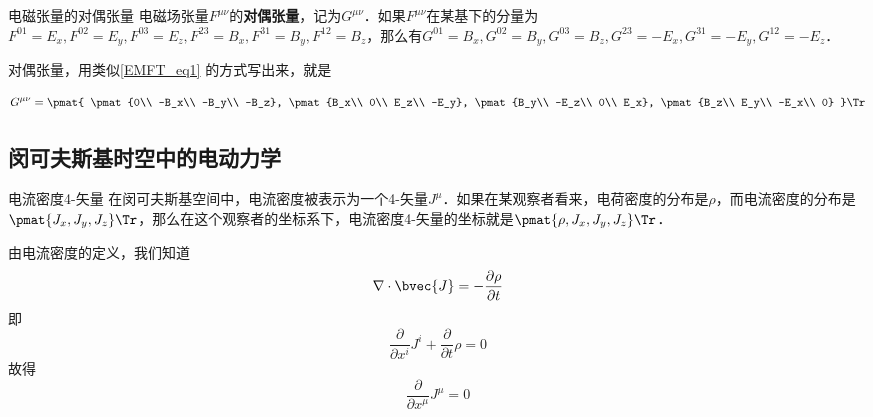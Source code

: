 \begin{definition}{电磁张量的对偶张量}
电磁场张量$F^{\mu\nu}$的\textbf{对偶张量}，记为$G^{\mu\nu}$．如果$F^{\mu\nu}$在某基下的分量为$F^{01}=E_x, F^{02}=E_y, F^{03}=E_z, F^{23}=B_x, F^{31}=B_y, F^{12}=B_z$，那么有$G^{01}=B_x, G^{02}=B_y, G^{03}=B_z, G^{23}=-E_x, G^{31}=-E_y, G^{12}=-E_z$．
\end{definition}

对偶张量，用类似\autoref{EMFT_eq1} 的方式写出来，就是

\begin{equation}
\begin{aligned}
G^{\mu\nu}=
\pmat{
\pmat{0\\ -B_x\\ -B_y\\ -B_z}, 
\pmat{B_x\\ 0\\ E_z\\ -E_y}, 
\pmat{B_y\\ -E_z\\ 0\\ E_x}, 
\pmat{B_z\\ E_y\\ -E_x\\ 0}
}\Tr
\end{aligned}
\end{equation}

\subsection{闵可夫斯基时空中的电动力学}

\begin{definition}{电流密度4-矢量}
在闵可夫斯基空间中，电流密度被表示为一个4-矢量$J^\mu$．如果在某观察者看来，电荷密度的分布是$\rho$，而电流密度的分布是$\pmat{J_x, J_y, J_z}\Tr$，那么在这个观察者的坐标系下，电流密度4-矢量的坐标就是$\pmat{\rho, J_x, J_y, J_z}\Tr$．
\end{definition}

由电流密度的定义，我们知道
\begin{equation}
\nabla\cdot\bvec{J}=-\frac{\partial\rho}{\partial t}
\end{equation}
即
\begin{equation}
\frac{\partial}{\partial x^i}J^i+\frac{\partial}{\partial t}\rho=0
\end{equation}
故得
\begin{equation}
\frac{\partial}{\partial x^\mu}J^\mu=0
\end{equation}





